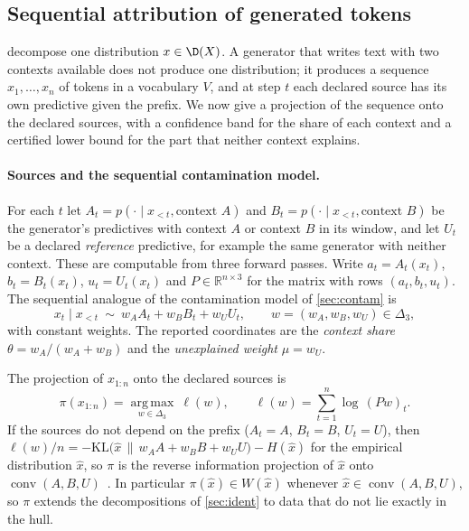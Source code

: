 \subsection{Sequential attribution of generated tokens}\label{sec:seqattr}

 decompose one distribution $x\in\D(X)$. A generator that writes text
with two contexts available does not produce one distribution; it produces a sequence
$x_1,\dots,x_n$ of tokens in a vocabulary $V$, and at step $t$ each declared source has its own
predictive given the prefix. We now give a projection of the sequence onto the declared sources,
with a confidence band for the share of each context and a certified lower bound for the part that
neither context explains.

\paragraph{Sources and the sequential contamination model.} For each $t$ let
$A_t=p(\cdot\mid x_{<t},\text{context }A)$ and $B_t=p(\cdot\mid x_{<t},\text{context }B)$ be the
generator's predictives with context $A$ or context $B$ in its window, and let $U_t$ be a declared
\emph{reference} predictive, for example the same generator with neither context. These are
computable from three forward passes. Write $a_t=A_t(x_t)$, $b_t=B_t(x_t)$, $u_t=U_t(x_t)$ and
$P\in\mathbb{R}^{n\times3}$ for the matrix with rows $(a_t,b_t,u_t)$. The sequential analogue of the
contamination model of \cref{sec:contam} is
\[
x_t\mid x_{<t}\ \sim\ w_AA_t+w_BB_t+w_UU_t,\qquad w=(w_A,w_B,w_U)\in\Delta_3,
\]
with constant weights. The reported coordinates are the \emph{context share}
$\theta=w_A/(w_A+w_B)$ and the \emph{unexplained weight} $\mu=w_U$.

\begin{definition}\label{def:likproj}
The projection of $x_{1:n}$ onto the declared sources is
\[
\pi(x_{1:n})=\operatorname*{arg\,max}_{w\in\Delta_3}\ \ell(w),\qquad
\ell(w)=\sum_{t=1}^n\log\,(Pw)_t .
\]
If the sources do not depend on the prefix ($A_t=A$, $B_t=B$, $U_t=U$), then
$\ell(w)/n=-\mathrm{KL}\big(\hat x\,\|\,w_AA+w_BB+w_UU\big)-H(\hat x)$ for the empirical distribution
$\hat x$, so $\pi$ is the reverse information projection of $\hat x$ onto
$\operatorname{conv}(A,B,U)$~\cite{Csiszar1975}. In particular $\pi(\hat x)\in W(\hat x)$ whenever
$\hat x\in\operatorname{conv}(A,B,U)$, so $\pi$ extends the decompositions of \cref{sec:ident} to data
that do not lie exactly in the hull.
\end{definition}

